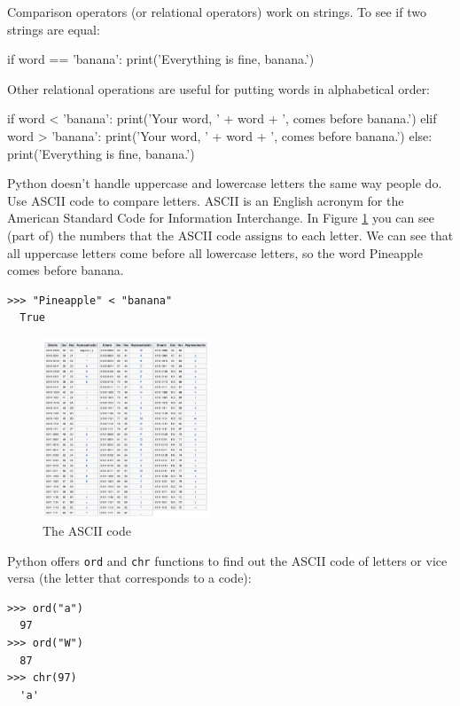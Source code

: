  


Comparison operators (or relational operators) work on strings. To see if two strings are equal:

\begin{python}[frame=single]
if word == 'banana':
    print('Everything is fine, banana.')
\end{python}
%
Other relational operations are useful for putting words in alphabetical order:

\begin{python}[frame=single]
if word < 'banana':
    print('Your word, ' + word + ', comes before banana.')
elif word > 'banana':
    print('Your word, ' + word + ', comes before banana.')
else:
    print('Everything is fine, banana.')
\end{python}
%
Python doesn't handle uppercase and lowercase letters the same way people do. Use ASCII code to compare letters. ASCII is an English acronym for the American Standard Code for Information Interchange. In Figure \ref{fig:ASCII} you can see (part of) the numbers that the ASCII code assigns to each letter. We can see that all uppercase letters come before all lowercase letters, so the word Pineapple comes before banana.

\begin{Verbatim}[frame=single]
>>> "Pineapple" < "banana"
  True
\end{Verbatim}


\begin{figure}
    \centering
    \includegraphics[width=190px]{images/ASCII.png}
    \caption{The ASCII code}
    \label{fig:ASCII}
\end{figure}

Python offers \texttt{ord} and \texttt{chr} functions to find out the ASCII code of letters or vice versa (the letter that corresponds to a code):

\begin{Verbatim}[frame=single]
>>> ord("a")
  97
>>> ord("W")
  87
>>> chr(97)
  'a'
\end{Verbatim}


